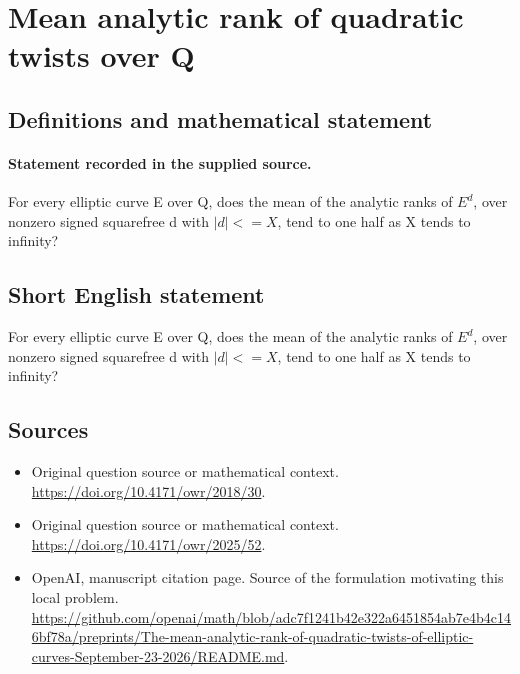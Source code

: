 \documentclass[11pt]{article}
\begin{document}
\section*{Mean analytic rank of quadratic twists over Q}\label{30007265}
\subsection{Definitions and mathematical statement}
\paragraph{Statement recorded in the supplied source.}
For every elliptic curve E over Q, does the mean of the analytic ranks of $E^{d}$, over nonzero signed squarefree d with $|d|<=X$, tend to one half as X tends to infinity?
\subsection{Short English statement}
For every elliptic curve E over Q, does the mean of the analytic ranks of $E^{d}$, over nonzero signed squarefree d with $|d|<=X$, tend to one half as X tends to infinity?
\subsection{Sources}
\begin{itemize}
\item[S1] Original question source or mathematical context.
\url{https://doi.org/10.4171/owr/2018/30}.
\item[S2] Original question source or mathematical context.
\url{https://doi.org/10.4171/owr/2025/52}.
\item[S3] OpenAI, manuscript citation page. Source of the formulation motivating this local problem.
\url{https://github.com/openai/math/blob/adc7f1241b42e322a6451854ab7e4b4c146bf78a/preprints/The-mean-analytic-rank-of-quadratic-twists-of-elliptic-curves-September-23-2026/README.md}.
\end{itemize}
\end{document}
